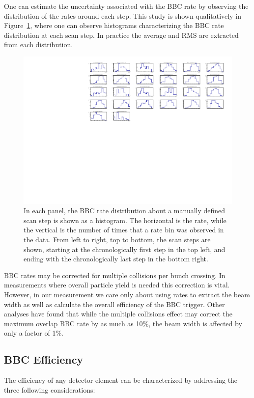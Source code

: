 One can estimate the uncertainty associated with the BBC rate by observing the
distribution of the rates around each step. This study is shown qualitatively in
Figure~\ref{fig:bbc_rate_step_dist}, where one can observe histograms
characterizing the BBC rate distribution at each scan step. In practice the
average and RMS are extracted from each distribution.

\begin{figure}
  \centering
  \includegraphics[width=\linewidth]{./figures/359711_bbc_rate_distribution_per_step.pdf}
  \caption{
    In each panel, the BBC rate distribution about a manually defined scan step
    is shown as a histogram. The horizontal is the rate, while the vertical is
    the number of times that a rate bin was observed in the data. From left to
    right, top to bottom, the scan steps are shown, starting at the
    chronologically first step in the top left, and ending with the
    chronologically last step in the bottom right.
  }
  \label{fig:bbc_rate_step_dist}
\end{figure}

BBC rates may be corrected for multiple collisions per bunch crossing. In
measurements where overall particle yield is needed this correction is vital.
However, in our measurement we care only about using rates to extract the beam
width as well as calculate the overall efficiency of the BBC trigger. Other
analyses have found that while the multiple collisions effect may correct the
maximum overlap BBC rate by as much as 10\%, the beam width is affected by only
a factor of 1\%.

\clearpage
\subsection{BBC Efficiency}
The efficiency of any detector element can be characterized by addressing the
three following considerations:

